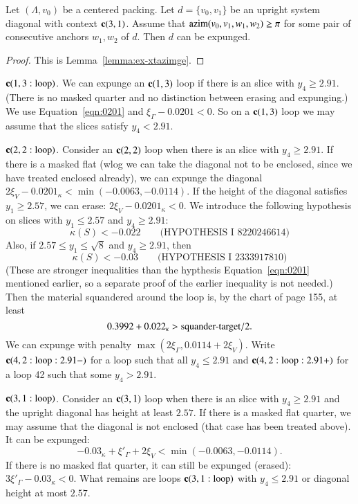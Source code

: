 \begin{lemma}
Let $(\Lambda,v_0)$ be a centered packing.  
Let $d = \{v_0,v_1\}$ be an upright
system diagonal with context ${\operatorname{\bf c}}{(3,1)}$.  
Assume that ${\operatorname{azim}}(v_0,v_1,w_1,w_2)\ge\pi$ for some pair of consecutive anchors $w_1,w_2$ of $d$.   Then $d$ can be expunged.
\end{lemma}

\begin{proof} This is Lemma~\ref{lemma:ex-xtazimge}.
\end{proof}



${\operatorname{\bf c}}{(1,3:{\operatorname{loop}})}$.  We can expunge an ${\operatorname{\bf c}}{(1,3)}$ loop if there is an slice with $y_4\ge 2.91$.  (There is no masked quarter and no distinction between erasing and expunging.)  We use Equation~\ref{eqn:0201} and $\xi_\Gamma - 0.0201 < 0$.  So on a ${\operatorname{\bf c}}{(1,3)}$ loop we may assume that the slices satisfy $y_4 < 2.91$.

${\operatorname{\bf c}}{(2,2:{\operatorname{loop}})}$. Consider an ${\operatorname{\bf c}}{(2,2)}$ loop when there is an slice with $y_4\ge 2.91$.  
If there is a masked flat (wlog we can take the diagonal not to be enclosed, since we have treated enclosed already),  we can expunge the diagonal $2\xi_V - 0.0201_\kappa < \min(-0.0063,-0.0114)$.  If the height of the diagonal satisfies $y_1\ge 2.57$, we can erase: $2\xi_V - 0.0201_\kappa < 0$.  We introduce the following
hypothesis on slices with $y_1 \le 2.57$ and $y_4 \ge 2.91$:
  \begin{equation}
  \kappa(S) < - 0.022\qquad\text{(HYPOTHESIS I 8220246614)}
  \end{equation}
Also, if $2.57\le y_1\le\sqrt8$ and $y_4\ge 2.91$, then
  \begin{equation}
  \kappa(S) < - 0.03\qquad\text{(HYPOTHESIS I 2333917810)}
  \end{equation}
(These are stronger inequalities than the hypthesis Equation~\ref{eqn:0201} mentioned earlier, so a separate proof of the earlier inequality is not needed.)
Then the material squandered around the loop is, by the chart of page 155, at least 
  $$
  0.3992 + 0.022_\kappa > {\operatorname{squander-target}}/2.
  $$
We can expunge with penalty $\max(2\xi_\Gamma,0.0114+2\xi_V)$.
Write ${\operatorname{\bf c}}{(4,2:{\operatorname{loop}}:2.91-)}$ for a loop such that all $y_4\le 2.91$ and  
${\operatorname{\bf c}}{(4,2:{\operatorname{loop}}:2.91+)}$ for a loop
42 such that some $y_4>2.91$.

  
${\operatorname{\bf c}}{(3,1:{\operatorname{loop}})}$.   Consider an ${\operatorname{\bf c}}{(3,1)}$ loop when there is an slice with $y_4\ge 2.91$ and the upright diagonal has height at least $2.57$.  If there is a masked
flat quarter, we may assume that the diagonal is not enclosed (that case
has been treated above).  It can be expunged: $$-0.03_\kappa + \xi'_\Gamma + 2\xi_V < \min(-0.0063,-0.0114).$$  If there is no masked flat quarter, it can
still be expunged (erased):  $3\xi'_\Gamma - 0.03_\kappa < 0$.  What remains are loops ${\operatorname{\bf c}}{(3,1:{\operatorname{loop}})}$ with $y_4\le 2.91$ or diagonal height at most $2.57$.


